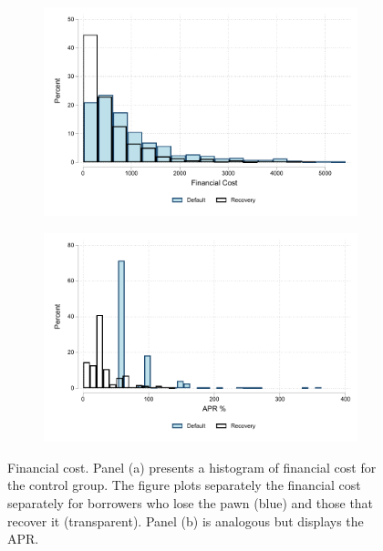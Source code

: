 \documentclass[ecta,nameyear,final]{econsocart}
\begin{document}
\begin{figure}
    \begin{center}
    \begin{subfigure}{.45\textwidth}
        \centering
        \includegraphics[width=\textwidth]{Figuras/hist_fc.pdf}
        \caption{}
    \end{subfigure}
     \begin{subfigure}{0.45\textwidth}
       \centering
      \includegraphics[width=\textwidth]{Figuras/hist_apr.pdf}
      \caption{}
    \end{subfigure}
    \end{center}
 \caption{Financial cost. Panel (a) presents a histogram of financial cost for the control group. The figure plots separately the financial cost separately for borrowers who lose the pawn (blue) and those that recover it (transparent).  Panel (b) is analogous but displays the APR.}
     \label{fc_hist}
\end{figure}
\end{document}
